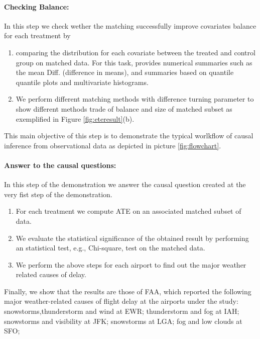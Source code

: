 \paragraph{\bf Checking Balance:}  In this step we check wether the matching successfully improve covariates balance for each treatment by
    \begin{enumerate}
      \item comparing the distribution for each covariate between the treated and control group on matched data. For this task, \GSQL provides numerical summaries such as the mean Diff. (difference in means), and summaries based on quantile quantile plots and multivariate histograms.

      \item We perform different matching methods with difference turning parameter to show different methods trade of balance and size of matched subset as exemplified in Figure \ref{fig:eteresult}(b).
       \end{enumerate}
      This main objective of this step is to demonstrate the typical worlkflow of causal inference from observational data as depicted in picture \ref{fig:flowchart}.

     \paragraph{\bf Answer to the causal questions:} In this step of the demonstration we answer the causal question created at the very fist step of the demonstration.

       \begin{enumerate}
       \item For each treatment we compute ATE on an associated matched subset of data.
      \item We evaluate the statistical significance of the obtained result by performing an statistical test, e.g., Chi-square, test on the matched data.
    \item We perform the above steps for each airport to find out the major weather related causes of delay.  
    \end{enumerate}

Finally, we show that the results are those of
FAA, which reported the following major weather-related
causes of flight delay at the airports under the study:
snowstorms,thunderstorm and wind at EWR; thunderstorm and fog at IAH;
snowstorms and visibility at JFK; snowstorms at LGA; fog and low
clouds at SFO;




